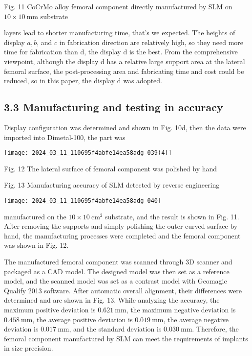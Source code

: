 \documentclass[10pt]{article}
\begin{document}
Fig. 11 CoCrMo alloy femoral component directly manufactured by SLM on $10 \times 10 \mathrm{~mm}$ substrate

layers lead to shorter manufacturing time, that's we expected. The heights of display $a, b$, and $c$ in fabrication direction are relatively high, so they need more time for fabrication than $\mathrm{d}$, the display $\mathrm{d}$ is the best. From the comprehensive viewpoint, although the display $\mathrm{d}$ has a relative large support area at the lateral femoral surface, the post-processing area and fabricating time and cost could be reduced, so in this paper, the display $\mathrm{d}$ was adopted.

\subsection*{3.3 Manufacturing and testing in accuracy}
Display configuration was determined and shown in Fig. 10d, then the data were imported into Dimetal-100, the part was

\begin{center}
\texttt{[image: 2024\_03\_11\_110695f4abfe14ea58adg-039(4)]}
\end{center}

Fig. 12 The lateral surface of femoral component was polished by hand

Fig. 13 Manufacturing accuracy of SLM detected by reverse engineering

\begin{center}
\texttt{[image: 2024\_03\_11\_110695f4abfe14ea58adg-040]}
\end{center}

manufactured on the $10 \times 10 \mathrm{~cm}^{2}$ substrate, and the result is shown in Fig. 11. After removing the supports and simply polishing the outer curved surface by hand, the manufacturing processes were completed and the femoral component was shown in Fig. 12.

The manufactured femoral component was scanned through 3D scanner and packaged as a CAD model. The designed model was then set as a reference model, and the scanned model was set as a contrast model with Geomagic Qualify 2013 software. After automatic overall alignment, their differences were determined and are shown in Fig. 13. While analyzing the accuracy, the maximum positive deviation is $0.621 \mathrm{~mm}$, the maximum negative deviation is $0.458 \mathrm{~mm}$, the average positive deviation is $0.019 \mathrm{~mm}$, the average negative deviation is $0.017 \mathrm{~mm}$, and the standard deviation is $0.030 \mathrm{~mm}$. Therefore, the femoral component manufactured by SLM can meet the requirements of implants in size precision.
\end{document}
